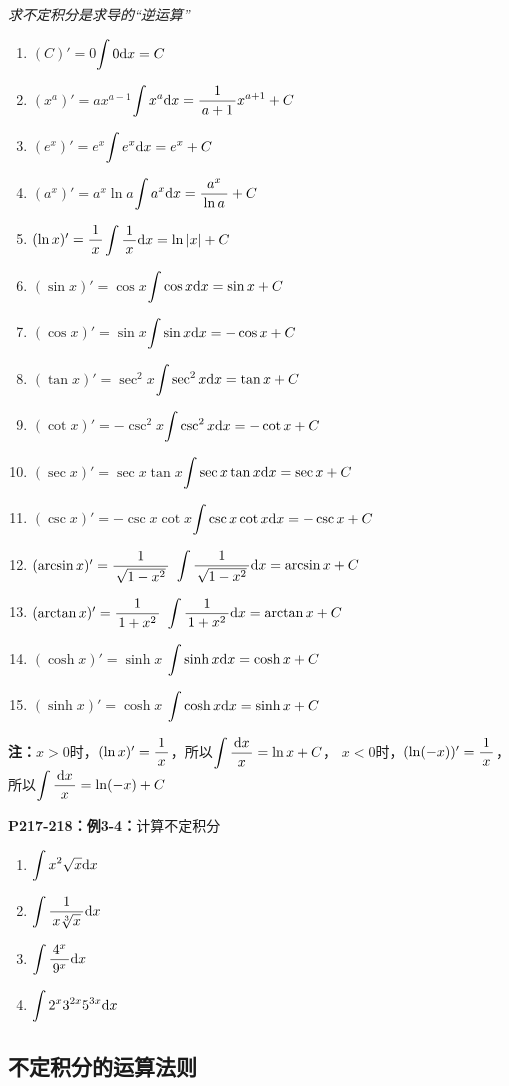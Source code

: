 {\it 求不定积分是求导的“逆运算”}
\begin{enumerate} [(1)]
  \setlength{\itemindent}{1cm}
  \item $(C)'=0$\hfill  {$\dint 0\d x=C$} 
  \item $(x^a)'=ax^{a-1}$\hfill  {$\dint x^a\d x=\df{1}{a+1}x^{a+1}+C$}
  \item $(e^x)'=e^x$\hfill  {$\dint e^x\d x=e^x+C$} 
  \item $(a^x)'=a^x\ln a$\hfill  {$\dint a^x\d x=\df{a^x}{\ln a}+C$}
  \item $(\ln x)'=\df 1x$\hfill  {$\dint \df 1x\d x=\ln|x|+C$}
  \item $(\sin x)'=\cos x$\hfill  {$\dint \cos x\d x=\sin x+C$} 
  \item $(\cos x)'=\sin x$\hfill  {$\dint \sin x\d x=-\cos x+C$}
  \item $(\tan x)'=\sec^2 x$\hfill  {$\dint \sec^2 x\d x=\tan x+C$} 
  \item $(\cot x)'=-\csc^2 x$\hfill  {$\dint \csc^2 x\d x=-\cot x+C$}
  \item $(\sec x)'=\sec x\tan x$\hfill $\dint\sec x\tan x\d x=\sec x+C$
  \item $(\csc x)'=-\csc x\cot x$\hfill $\dint\csc x\cot x\d x=-\csc x+C$
  \item $(\arcsin x)'=\df{1}{\sqrt{1-x^2}}$ \hfill  
  {$\dint{\df{1}{\sqrt{1-x^2}}}\d x=\arcsin x+C$} 
  \item $(\arctan x)'=\df{1}{1+x^2}$ \hfill 
  {$\dint \df{1}{1+x^2}\d x=\arctan x+C$}
  \item $(\cosh x)'=\sinh x$ \hfill $\dint\sinh x\d x=\cosh x+C$
  \item $(\sinh x)'=\cosh x$ \hfill $\dint\cosh x\d x=\sinh x+C$
\end{enumerate}

{\bf 注：}$x>0$时，$(\ln x)'=\df 1x$，所以$\dint\df{\d x}x=\ln x+C$，
$x<0$时，$(\ln(-x))'=\df1x$，所以$\dint\df{\d x}x=\ln(-x)+C$

{\bf P217-218：例3-4：}计算不定积分
\begin{enumerate}[(1)]
  \setlength{\itemindent}{1cm}
  \item $\dint x^2\sqrt{x}\d x$ 
  \item $\dint \df{1}{x\sqrt[3]{x}}\d x$ 
  \item $\dint \df{4^x}{9^x}\d x$ 
  \item $\dint 2^x3^{2x}5^{3x}\d x$
\end{enumerate}

\subsection{不定积分的运算法则}

